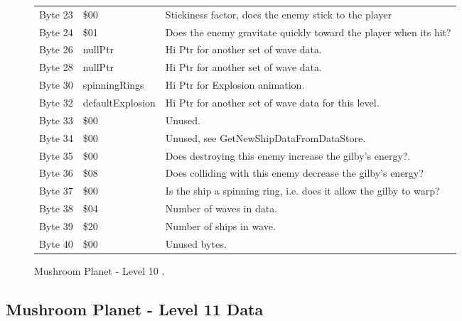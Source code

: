 \begin{figure}[H]
{\begin{adjustbox}{width=12cm}
\begin{tabular}{lll}
 Byte 23 & \$00                        & Stickiness factor, does the enemy stick to the player              \\
 Byte 24 & \$01                        & Does the enemy gravitate quickly toward the player when its hit?   \\
 Byte 26 & nullPtr                    & Hi Ptr for another set of wave data.                               \\
 Byte 28 & nullPtr                    & Hi Ptr for another set of wave data.                               \\
 Byte 30 & spinningRings              & Hi Ptr for Explosion animation.                                    \\
 Byte 32 & defaultExplosion           & Hi Ptr for another set of wave data for this level.                \\
 Byte 33 & \$00                        & Unused.                                                            \\
 Byte 34 & \$00                        & Unused, see GetNewShipDataFromDataStore.                           \\
 Byte 35 & \$00                        & Does destroying this enemy increase the gilby's energy?.           \\
 Byte 36 & \$08                        & Does colliding with this enemy decrease the gilby's energy?        \\
 Byte 37 & \$00                        & Is the ship a spinning ring, i.e. does it allow the gilby to warp? \\
 Byte 38 & \$04                        & Number of waves in data.                                           \\
 Byte 39 & \$20                        & Number of ships in wave.                                           \\
 Byte 40 & \$00                        & Unused bytes.                                                      \\
\bottomrule
\end{tabular}

  \end{adjustbox}

  }\caption*{Mushroom Planet - Level 10
.}
\end{figure}

\clearpage
\subsection{Mushroom Planet - Level 11 Data}

